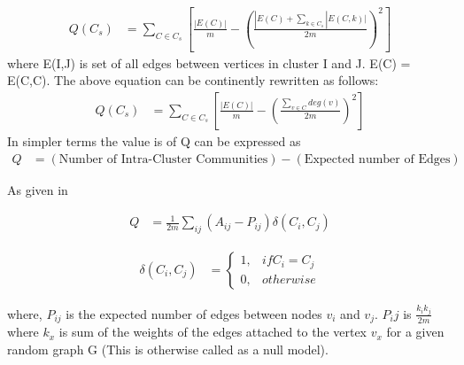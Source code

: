 \begin{equation} \label{eq1}
\begin{split}
Q(C_s) &= \sum_{C \in C_s}\left[ \frac{|E(C)|}{m} - \left( \frac{|E(C)+\sum_{k \in C_s}|E(C,k)|}{2m} \right)^2 \right]
\end{split}
\end{equation}
where E(I,J) is set of all edges between vertices in cluster I and J. E(C) = E(C,C).
The above equation can be continently rewritten as follows: 
\begin{equation} \label{eq1}
\begin{split}
Q(C_s) &= \sum_{C \in C_s}\left[ \frac{|E(C)|}{m} - \left( \frac{\sum_{v \in C}deg(v)}{2m} \right)^2 \right]
\end{split}
\end{equation}
In simpler terms the value is of Q can be expressed as 
\begin{equation} \label{eq1}
\begin{split}
Q &= \left( \text{Number of Intra-Cluster Communities} \right) - (\text{Expected number of Edges})
\end{split}
\end{equation}

As given in \cite{louvain}

\begin{equation}
    \begin{split}
Q &= \frac{1}{2m} \sum_{ij} \left(A_{ij} - P_{ij}\right) \delta(C_i,C_j)
\end{split}
    \end{equation}

\begin{equation}
\begin{split}
\delta(C_i,C_j) &= \begin{cases} 1 ,& if C_i = C_j \\
 0,& otherwise
 \end{cases}
\end{split}
\end{equation}

where, $P_{ij}$ is the expected number of edges between nodes $v_i$ and $v_j$. $P_ij$ is $\frac{k_ik_j}{2m}$ where $k_x$ is sum of the weights of the edges attached to the vertex $v_x$ for a given random graph G (This is otherwise called as a null model).
    
